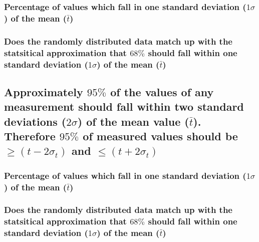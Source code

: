 \documentclass[11pt, letterpaper, includehead]{article}
\begin{document}
  \subsubsection{Percentage of values which fall in one standard deviation 
  ($1\sigma$) of the mean ($\bar{t}$)}

  \subsubsection{Does the randomly distributed data match up with the statsitical approximation
  that $68\%$ should fall within one standard deviation ($1\sigma$) of the mean ($\bar{t}$)}

  \subsection{Approximately $95\%$ of the values of any measurement should fall within two 
  standard deviations ($2 \sigma$) of the mean value ($\bar{t}$). Therefore $95\%$ of measured 
  values should be $\geq (t - 2 \sigma_t)$ and $\leq (t + 2 \sigma_t)$} %

  \subsubsection{Percentage of values which fall in one standard deviation 
  ($1\sigma$) of the mean ($\bar{t}$)}

  \subsubsection{Does the randomly distributed data match up with the statsitical approximation
  that $68\%$ should fall within one standard deviation ($1\sigma$) of the mean ($\bar{t}$)}
\end{document}
